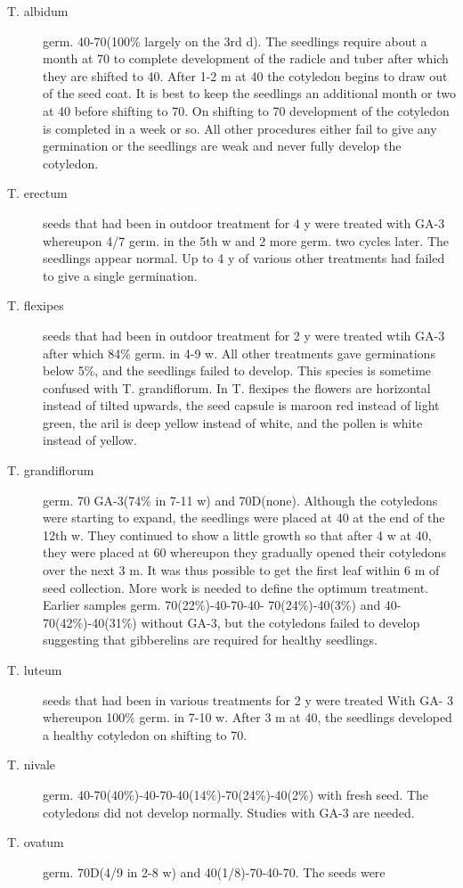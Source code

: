 \begin{description}
\item[T. albidum] germ. 40-70(100\% largely on the 3rd d). The seedlings require
about a month at 70 to complete development of the radicle and tuber after which they
are shifted to 40. After 1-2 m at 40 the cotyledon begins to draw out of the seed coat. It
is best to keep the seedlings an additional month or two at 40 before shifting to 70. On
shifting to 70 development of the cotyledon is completed in a week or so. All other
procedures either fail to give any germination or the seedlings are weak and never
fully develop the cotyledon.

\item[T. erectum] seeds that had been in outdoor treatment for 4 y were treated with
GA-3 whereupon 4/7 germ. in the 5th w and 2 more germ. two cycles later. The
seedlings appear normal. Up to 4 y of various other treatments had failed to give a
single germination.
\item[T. flexipes] seeds that had been in outdoor treatment for 2 y were treated wtih
GA-3 after which 84\% germ. in 4-9 w. All other treatments gave germinations below
5\%, and the seedlings failed to develop. This species is sometime confused with T.
grandiflorum. In T. flexipes the flowers are horizontal instead of tilted upwards, the
seed capsule is maroon red instead of light green, the aril is deep yellow instead of
white, and the pollen is white instead of yellow.
\item[T. grandiflorum] germ. 70 GA-3(74\% in 7-11 w) and 70D(none). Although the
cotyledons were starting to expand, the seedlings were placed at 40 at the end of the
12th w. They continued to show a little growth so that after 4 w at 40, they were
placed at 60 whereupon they gradually opened their cotyledons over the next 3 m. It
was thus possible to get the first leaf within 6 m of seed collection. More work is
needed to define the optimum treatment. Earlier samples germ. 70(22\%)-40-70-40-
70(24\%)-40(3\%) and 40-70(42\%)-40(31\%) without GA-3, but the cotyledons failed to
develop suggesting that gibberelins are required for healthy seedlings.
\item[T. luteum] seeds that had been in various treatments for 2 y were treated With GA-
3 whereupon 100\% germ. in 7-10 w. After 3 m at 40, the seedlings developed a
healthy cotyledon on shifting to 70.
\item[T. nivale] germ. 40-70(40\%)-40-70-40(14\%)-70(24\%)-40(2\%) with fresh seed.
The cotyledons did not develop normally. Studies with GA-3 are needed.
\item[T. ovatum] germ. 70D(4/9 in 2-8 w) and 40(1/8)-70-40-70. The seeds were

\end{description}
